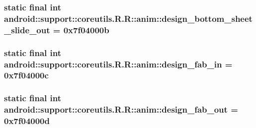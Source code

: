 \hypertarget{classandroid_1_1support_1_1coreutils_1_1_r_1_1anim_88779dbcc042a7cc7a263b4c29d2f09d}{
\subsubsection[{design\_\-bottom\_\-sheet\_\-slide\_\-out}]{\setlength{\rightskip}{0pt plus 5cm}static final int android::support::coreutils.R.R::anim::design\_\-bottom\_\-sheet\_\-slide\_\-out = 0x7f04000b}}
\label{classandroid_1_1support_1_1coreutils_1_1_r_1_1anim_88779dbcc042a7cc7a263b4c29d2f09d}


\hypertarget{classandroid_1_1support_1_1coreutils_1_1_r_1_1anim_129f7358c87af2f779a1e5d1bff9fea8}{
\subsubsection[{design\_\-fab\_\-in}]{\setlength{\rightskip}{0pt plus 5cm}static final int android::support::coreutils.R.R::anim::design\_\-fab\_\-in = 0x7f04000c}}
\label{classandroid_1_1support_1_1coreutils_1_1_r_1_1anim_129f7358c87af2f779a1e5d1bff9fea8}


\hypertarget{classandroid_1_1support_1_1coreutils_1_1_r_1_1anim_01ee955012caffeec1067174f6c72349}{
\subsubsection[{design\_\-fab\_\-out}]{\setlength{\rightskip}{0pt plus 5cm}static final int android::support::coreutils.R.R::anim::design\_\-fab\_\-out = 0x7f04000d}}
\label{classandroid_1_1support_1_1coreutils_1_1_r_1_1anim_01ee955012caffeec1067174f6c72349}


